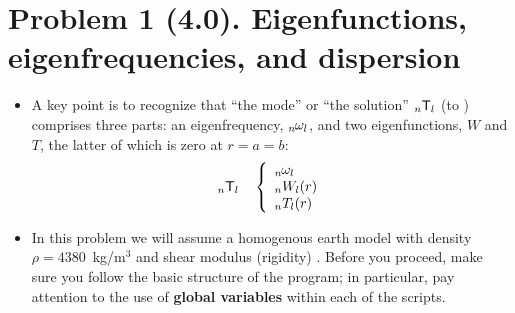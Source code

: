 \documentclass[11pt,titlepage,fleqn]{article}
\newcommand{\Tnl}{\mbox{${}_nT_l$}}
\newcommand{\Wnl}{\mbox{${}_nW_l$}}
\newcommand{\omnl}{\mbox{${}_{n\hspace{-0.2 mm}}\omega_l$}}
\begin{document}


\pagebreak
\section*{Problem 1 (4.0). Eigenfunctions, eigenfrequencies, and dispersion}

\begin{itemize}
\item A key point is to recognize that ``the mode'' or ``the solution'' $_n\mbox{${\sf T}$}_l$ (to ) comprises three parts: an eigenfrequency, $\omnl$, and two eigenfunctions, $W$ and $T$, the latter of which is zero at $r = a = b$:
%
\begin{equation}
_n\ssT_l \hspace{10pt} \left\{
\begin{array}{l}
\omnl \\
\Wnl(r) \\
\Tnl(r)
\end{array} \right.
\end{equation}

\item In this problem we will assume a homogenous earth model with density $\rho = 4380$~kg/m$^3$ and shear modulus (rigidity) . Before you proceed, make sure you follow the basic structure of the program; in particular, pay attention to the use of {\bf global variables} within each of the scripts.
\end{itemize}
\end{document}
